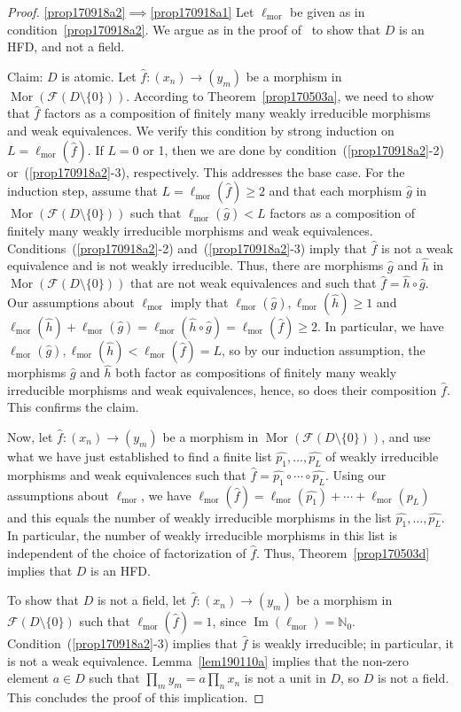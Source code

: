 \documentclass[reqno]{amsart}
\theoremstyle{plain}
\theoremstyle{definition}
\newcommand{\cat}[1]{\mathcal{#1}}
\newcommand{\catf}{\cat{F}}
\newcommand{\im}{\operatorname{Im}}
\newcommand{\bbn}{\mathbb{N}}
\renewcommand{\geq}{\geqslant}
\numberwithin{equation}{lem}
\newcommand{\zaks}[1]{\ell_{\text{#1}}}
\newcommand{\zaksmor}{\zaks{mor}}
\newcommand{\mord}{\operatorname{Mor}(\catf(D \setminus \{0\}))}
\begin{document}
\begin{proof}
\eqref{prop170918a2}$\implies$\eqref{prop170918a1}
Let $\zaksmor$ be given as in condition~\eqref{prop170918a2}.
We argue as in the proof of~\cite[Lemma~1.3]{zaks} to show that $D$ is an HFD,
and not a field.

Claim: $D$ is atomic.
Let $\hat f\colon (x_n)\to(y_m)$ be a morphism in $\mord$.
According to Theorem~\ref{prop170503a}, we need to show that $\hat f$ factors as a  composition
of finitely many weakly irreducible morphisms and weak equivalences.
We verify this condition by strong induction on $L=\zaksmor(\hat f)$.
If $L=0$ or 1, then we are done by condition~(\ref{prop170918a2}-2) or~(\ref{prop170918a2}-3), respectively.
This addresses the base case. 
For the induction step, assume that $L=\zaksmor(\hat f)\geq 2$ and that each morphism $\hat g$ in
$\mord$ such that $\zaksmor(\hat g)<L$ factors as a  composition
of finitely many weakly irreducible morphisms and weak equivalences.
Conditions~(\ref{prop170918a2}-2) and~(\ref{prop170918a2}-3) imply that $\hat f$ is not a weak equivalence and
is not weakly irreducible. Thus, there are morphisms $\hat g$ and $\hat h$ in $\mord$ that are not weak equivalences
and such that $\hat f=\hat h\circ\hat g$. 
Our assumptions about $\zaksmor$ imply that $\zaksmor(\hat g),\zaksmor(\hat h)\geq 1$ and 
$\zaksmor(\hat h)+\zaksmor(\hat g)=\zaksmor(\hat h\circ\hat g)=\zaksmor(\hat f)\geq 2$.
In particular, we have $\zaksmor(\hat g),\zaksmor(\hat h)<\zaksmor(\hat f)=L$,
so by our induction assumption, the morphisms $\hat g$ and $\hat h$ both factor as   compositions
of finitely many weakly irreducible morphisms and weak equivalences, hence,
so does their composition $\hat f$.
This confirms the claim.


Now, let $\hat f\colon (x_n)\to(y_m)$ be a morphism in $\mord$,
and use what we have just established to find a finite list $\widehat{p_1},\ldots,\widehat{p_L}$
of weakly irreducible morphisms and weak equivalences such that $\hat f=\widehat{p_1}\circ\cdots\circ\widehat{p_L}$.
Using our assumptions about $\zaksmor$, we have
$\zaksmor(\hat f)=\zaksmor(\widehat{p_1})+\cdots+\zaksmor(\widehat{p_L})$ and this equals the number of 
weakly irreducible morphisms in the list $\widehat{p_1},\ldots,\widehat{p_L}$. 
In particular, the number of weakly irreducible morphisms in this list is independent of the choice of factorization of $\hat f$.
Thus, Theorem~\ref{prop170503d} implies that $D$ is an HFD.

To show that $D$ is not a field, let $\hat f\colon (x_n)\to(y_m)$ be a morphism in 
$\catf(D\setminus\{0\})$ such that $\zaksmor(\hat f)=1$, since $\im(\zaksmor)=\bbn_0$.
Condition~(\ref{prop170918a2}-3) implies that $\hat f$ is weakly irreducible; in particular, it is not a weak equivalence.
Lemma~\ref{lem190110a}
implies
that the non-zero element $a\in D$ such that $\prod_my_m=a\prod_nx_n$ is not a unit in $D$,
so $D$ is not a field.
This concludes the proof of this implication.


\end{proof}
\end{document}
